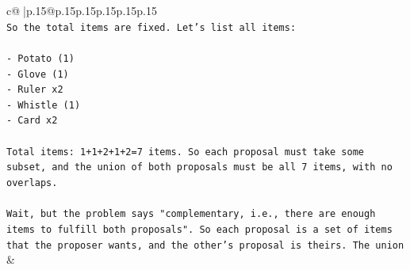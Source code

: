 \documentclass{article}
\begin{document}
{\begin{supertabular}{c@{$\;$}|p{.15\linewidth}@{}p{.15\linewidth}p{.15\linewidth}p{.15\linewidth}p{.15\linewidth}p{.15\linewidth}}
{{{\\ 
\texttt{So the total items are fixed. Let's list all items:} \\
\\ 
\texttt{{-} Potato (1)} \\
\texttt{{-} Glove (1)} \\
\texttt{{-} Ruler x2} \\
\texttt{{-} Whistle (1)} \\
\texttt{{-} Card x2} \\
\\ 
\texttt{Total items: 1+1+2+1+2=7 items. So each proposal must take some subset, and the union of both proposals must be all 7 items, with no overlaps.} \\
\\ 
\texttt{Wait, but the problem says "complementary, i.e., there are enough items to fulfill both proposals". So each proposal is a set of items that the proposer wants, and the other's proposal is theirs. The union} \\
            }
        }
    }
    & \\ \\


\end{supertabular}}
\end{document}
